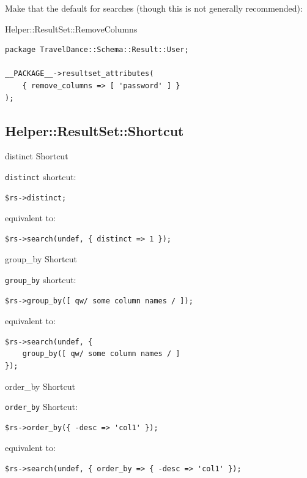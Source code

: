 Make that the default for searches (though this is not generally recommended):

\begin{frame}[fragile]{Helper::ResultSet::RemoveColumns}
\begin{lstlisting}
package TravelDance::Schema::Result::User;

__PACKAGE__->resultset_attributes(
    { remove_columns => [ 'password' ] }
);
\end{lstlisting}
\end{frame}

\subsection{Helper::ResultSet::Shortcut}

\begin{frame}[fragile]{distinct Shortcut}

\verb|distinct| shortcut:

\begin{lstlisting}
$rs->distinct;
\end{lstlisting}

equivalent to:

\begin{lstlisting}
$rs->search(undef, { distinct => 1 });
\end{lstlisting}
\end{frame}

\begin{frame}[fragile]{group\_by Shortcut}

\verb|group_by| shortcut:

\begin{lstlisting}
$rs->group_by([ qw/ some column names / ]);
\end{lstlisting}

equivalent to:

\begin{lstlisting}
$rs->search(undef, { 
    group_by([ qw/ some column names / ] 
});
\end{lstlisting}
\end{frame}

\begin{frame}[fragile]{order\_by Shortcut}

\verb|order_by| Shortcut:

\begin{lstlisting}
$rs->order_by({ -desc => 'col1' });
\end{lstlisting}

equivalent to:

\begin{lstlisting}
$rs->search(undef, { order_by => { -desc => 'col1' });
\end{lstlisting}

\end{frame}

